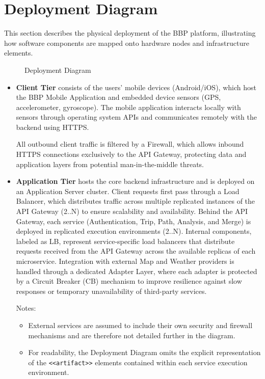\section{Deployment Diagram}
This section describes the physical deployment of the BBP platform, illustrating how software components are mapped onto hardware nodes and infrastructure elements.

\begin{figure}[H]
    \centering
    
    \caption{Deployment Diagram}
    \label{fig: cdeployment_diagram}
\end{figure}

\begin{itemize}
    \item \textbf{Client Tier} consists of the users' mobile devices (Android/iOS), which host the BBP Mobile Application and embedded device sensors (GPS, accelerometer, gyroscope). The mobile application interacts locally with sensors through operating system APIs and communicates remotely with the backend using HTTPS.
    
    All outbound client traffic is filtered by a Firewall, which allows inbound HTTPS connections exclusively to the API Gateway, protecting data and application layers from potential man-in-the-middle threats.
    
    \item \textbf{Application Tier} hosts the core backend infrastructure and is deployed on an Application Server cluster. Client requests first pass through a Load Balancer, which distributes traffic across multiple replicated instances of the API Gateway (2..N) to ensure scalability and availability. Behind the API Gateway, each service (Authentication, Trip, Path, Analysis, and Merge) is deployed in replicated execution environments (2..N). Internal components, labeled as LB, represent service-specific load balancers that distribute requests received from the API Gateway across the available replicas of each microservice. Integration with external Map and Weather providers is handled through a dedicated Adapter Layer, where each adapter is protected by a Circuit Breaker (CB) mechanism to improve resilience against slow responses or temporary unavailability of third-party services.
    
    Notes:
    \begin{itemize}
        \item External services are assumed to include their own security and firewall mechanisms and are therefore not detailed further in the diagram.
        \item For readability, the Deployment Diagram omits the explicit representation of the \texttt{<<artifact>>} elements contained within each service execution environment.
    \end{itemize}
    

\end{itemize}
